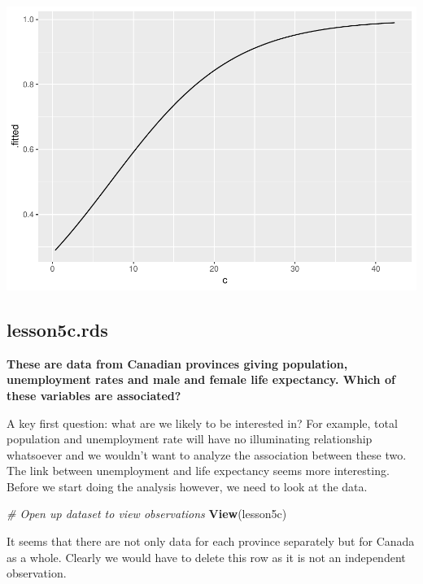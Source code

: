 \documentclass[]{book}
\newenvironment{Shaded}{\begin{snugshade}}{\end{snugshade}}
\newcommand{\CommentTok}[1]{\textcolor[rgb]{0.56,0.35,0.01}{\textit{#1}}}
\newcommand{\KeywordTok}[1]{\textcolor[rgb]{0.13,0.29,0.53}{\textbf{#1}}}
\newcommand{\NormalTok}[1]{#1}
\newcommand{\OperatorTok}[1]{\textcolor[rgb]{0.81,0.36,0.00}{\textbf{#1}}}
\newcommand{\StringTok}[1]{\textcolor[rgb]{0.31,0.60,0.02}{#1}}
\begin{document}
\includegraphics{09-answers_files/figure-latex/week5n-1.pdf}

\hypertarget{lesson5c.rds}{%
\subsection{lesson5c.rds}\label{lesson5c.rds}}

\textbf{These are data from Canadian provinces giving population,
unemployment rates and male and female life expectancy. Which of these
variables are associated?}

A key first question: what are we likely to be interested in? For
example, total population and unemployment rate will have no
illuminating relationship whatsoever and we wouldn't want to analyze the
association between these two. The link between unemployment and life
expectancy seems more interesting. Before we start doing the analysis
however, we need to look at the data.

\begin{Shaded}
\begin{Highlighting}[]
\CommentTok{# Open up dataset to view observations}
\KeywordTok{View}\NormalTok{(lesson5c)}
\end{Highlighting}
\end{Shaded}

It seems that there are not only data for each province separately but
for Canada as a whole. Clearly we would have to delete this row as it is
not an independent observation.

\begin{Shaded}
\end{Shaded}
\end{document}
